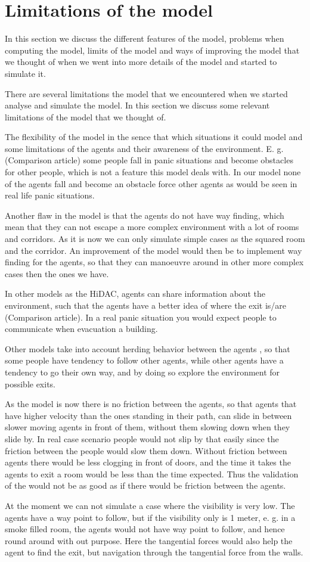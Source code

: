 \section{Limitations of the model}\label{sec:limitations}
In this section we discuss the different features of the model, problems when computing the model,
limits of the model and ways of improving the model that we thought of when we went into more
details of the model and started to simulate it.

There are several limitations the model that we encountered when we started analyse and simulate the
model. In this section we discuss some relevant limitations of the model that we thought of.

The flexibility of the model in the sence that which situations it could model and some limitations
of the agents and their awareness of the environment.
E. g. (Comparison article) some people fall in panic situations and become obstacles for other people,
which is not a feature this model deals with. In our model none of the agents fall and become an obstacle force
other agents as would be seen in real life panic situations.

Another flaw in the model is that the agents do not have way finding, which mean that they can not escape
a more complex environment with a lot of rooms and corridors. As it is now we can only simulate simple
cases as the squared room and the corridor.
An improvement of the model would then be to implement way finding for the agents, so that they can manoeuvre
around in other more complex cases then the ones we have.

In other models as the HiDAC, agents can share information about the environment, such that the agents have a better
idea of where the exit is/are (Comparison article). In a real panic situation you would expect people to communicate when
evacuation a building.

Other models take into account herding behavior between the agents \cite{helbing00}, so that some people have tendency to
follow other agents, while other agents have a tendency to go their own way, and by doing so explore the environment
for possible exits.

As the model is now there is no friction between the agents, so that agents that have higher velocity than
the ones standing in their path, can slide in between slower moving agents in front of them, without them slowing
down when they slide by. In real case scenario people would not slip by that easily since the friction between
the people would slow them down.
Without friction between agents there would be less clogging in front of doors, and the time it takes the agents
to exit a room would be less than the time expected. Thus the validation of the would not be as good as if there
would be friction between the agents.

At the moment we can not simulate a case where the visibility is very low. The agents have a way point to follow,
but if the visibility only is 1 meter, e. g. in a smoke filled room, the agents would not have way point to follow,
and hence round around with out purpose. Here the tangential forces would also help the agent to find the exit,
but navigation through the tangential force from the walls.